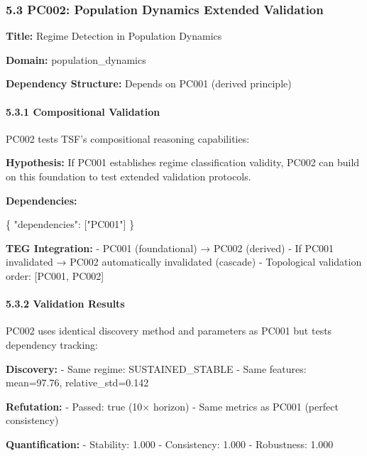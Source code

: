 \documentclass[
]{article}
\newenvironment{Shaded}{}{}
\newcommand{\DataTypeTok}[1]{\textcolor[rgb]{0.56,0.13,0.00}{#1}}
\newcommand{\FunctionTok}[1]{\textcolor[rgb]{0.02,0.16,0.49}{#1}}
\newcommand{\OtherTok}[1]{\textcolor[rgb]{0.00,0.44,0.13}{#1}}
\newcommand{\StringTok}[1]{\textcolor[rgb]{0.25,0.44,0.63}{#1}}
\begin{document}
\subsubsection{5.3 PC002: Population Dynamics Extended
Validation}\label{pc002-population-dynamics-extended-validation}

\textbf{Title:} Regime Detection in Population Dynamics

\textbf{Domain:} population\_dynamics

\textbf{Dependency Structure:} Depends on PC001 (derived principle)

\paragraph{5.3.1 Compositional
Validation}\label{compositional-validation}

PC002 tests TSF's compositional reasoning capabilities:

\textbf{Hypothesis:} If PC001 establishes regime classification
validity, PC002 can build on this foundation to test extended validation
protocols.

\textbf{Dependencies:}

\begin{Shaded}
\begin{Highlighting}[]
\FunctionTok{\{}
  \DataTypeTok{"dependencies"}\FunctionTok{:} \OtherTok{[}\StringTok{"PC001"}\OtherTok{]}
\FunctionTok{\}}
\end{Highlighting}
\end{Shaded}

\textbf{TEG Integration:} - PC001 (foundational) → PC002 (derived) - If
PC001 invalidated → PC002 automatically invalidated (cascade) -
Topological validation order: {[}PC001, PC002{]}

\paragraph{5.3.2 Validation Results}\label{validation-results}

PC002 uses identical discovery method and parameters as PC001 but tests
dependency tracking:

\textbf{Discovery:} - Same regime: SUSTAINED\_STABLE - Same features:
mean=97.76, relative\_std=0.142

\textbf{Refutation:} - Passed: true (10× horizon) - Same metrics as
PC001 (perfect consistency)

\textbf{Quantification:} - Stability: 1.000 - Consistency: 1.000 -
Robustness: 1.000
\end{document}

